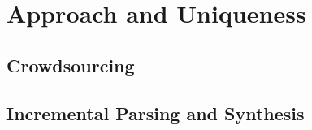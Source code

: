 \section{Approach and Uniqueness}
\subsection{Crowdsourcing}
\subsection{Incremental Parsing and Synthesis}
